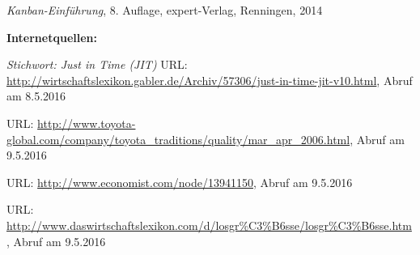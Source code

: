 \begin{thebibliography}{}
	 {\sl Kanban-Einführung}, 8. Auflage, expert-Verlag, Renningen, 2014
	
	
	\textbf{Internetquellen:}

	 {\sl Stichwort: Just in Time (JIT)} URL: \url{http://wirtschaftslexikon.gabler.de/Archiv/57306/just-in-time-jit-v10.html}, Abruf am 8.5.2016

	 URL: \url{	http://www.toyota-global.com/company/toyota_traditions/quality/mar_apr_2006.html}, Abruf am 9.5.2016
	
	 URL: \url{http://www.economist.com/node/13941150}, Abruf am 9.5.2016
	
	 URL: \url{http://www.daswirtschaftslexikon.com/d/losgr%C3%B6sse/losgr%C3%B6sse.htm}, Abruf am 9.5.2016
	
	 
  \end{thebibliography}
